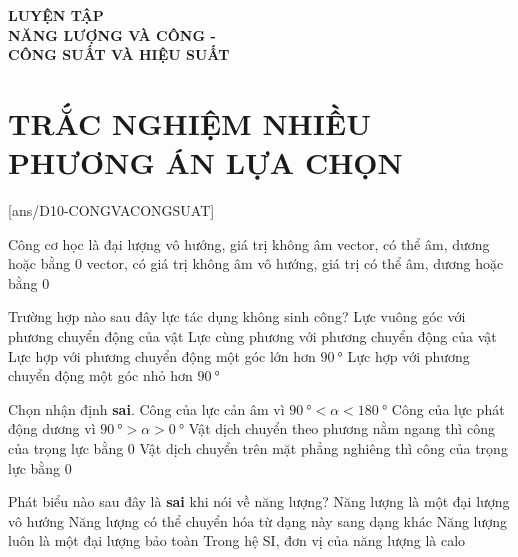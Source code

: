 \begin{center}\textbf{\color{red}LUYỆN TẬP}\\
	\textbf{NĂNG LƯỢNG VÀ CÔNG -}\\
	\textbf{CÔNG SUẤT VÀ HIỆU SUẤT}
\end{center}
\section{TRẮC NGHIỆM NHIỀU PHƯƠNG ÁN LỰA CHỌN}
[ans/D10-CONGVACONGSUAT]
\begin{ex}
	Công cơ học là đại lượng	
	\choice
	{vô hướng, giá trị không âm}
	{vector, có thể âm, dương hoặc bằng 0}
	{vector, có giá trị không âm}
	{\True vô hướng, giá trị có thể âm, dương hoặc bằng 0}
	\loigiai{}
\end{ex}
\begin{ex}
	Trường hợp nào sau đây lực tác dụng không sinh công?
	\choice
	{\True Lực vuông góc với phương chuyển động của vật}
	{Lực cùng phương với phương chuyển động của vật}
	{Lực hợp với phương chuyển động một góc lớn hơn $\SI{90}{\degree}$}
	{Lực hợp với phương chuyển động một góc nhỏ hơn $\SI{90}{\degree}$}
\end{ex}	
\begin{ex}
	Chọn nhận định \textbf{sai}.	
	\choice
	{Công của lực cản âm vì $\SI{90}{\degree} < \alpha <\SI{180}{\degree}$}
	{Công của lực phát động dương vì $\SI{90}{\degree} > \alpha >\SI{0}{\degree}$}
	{Vật dịch chuyển theo phương nằm ngang thì công của trọng lực bằng $0$}
	{\True Vật dịch chuyển trên mặt phẳng nghiêng thì công của trọng lực bằng $0$}
\end{ex}
\begin{ex}
	Phát biểu nào sau đây là \textbf{sai} khi nói về năng lượng?
	\choice
	{Năng lượng là một đại lượng vô hướng}
	{Năng lượng có thể chuyển hóa từ dạng này sang dạng khác}
	{Năng lượng luôn là một đại lượng bảo toàn}
	{\True Trong hệ SI, đơn vị của năng lượng là calo}
	\loigiai{}
\end{ex}
